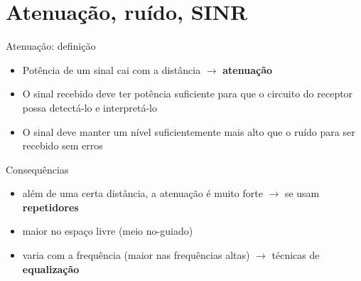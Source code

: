 \documentclass[aspectratio=169,11pt]{beamer}
\begin{document}
\section{Atenuação, ruído, SINR}

\begin{frame}{Atenuação: definição}
  \begin{itemize}
    \item Potência de um sinal cai com a distância $\rightarrow$ \textbf{atenuação}
    \item O sinal recebido deve ter potência suficiente para que o circuito do receptor possa detectá-lo e interpretá-lo
    \item O sinal deve manter um nível suficientemente mais alto que o ruído para ser recebido sem erros
  \end{itemize}
  \begin{block}{Consequências}
    \begin{itemize}
      \item além de uma certa distância, a atenuação é muito forte $\rightarrow$ se usam \textbf{repetidores}
      \item maior no espaço livre (meio no-guiado)
      \item varia com a frequência (maior nas frequências altas) $\rightarrow$ técnicas de \textbf{equalização}
    \end{itemize}
  \end{block}
\end{frame}
\end{document}
